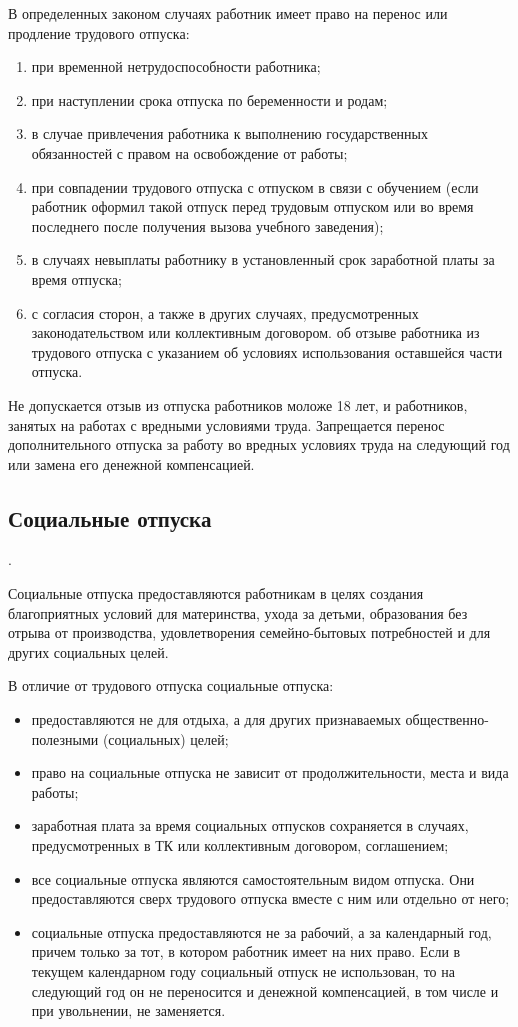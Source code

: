 \documentclass[14pt,a4paper]{extarticle}
\begin{document}
В определенных законом случаях работник имеет право на перенос или продление трудового отпуска:
\begin{enumerate}
\item при временной нетрудоспособности работника;
\item при наступлении срока отпуска по беременности и родам;
\item в случае привлечения работника к выполнению государственных обязанностей с правом на освобождение от работы;
\item при совпадении трудового отпуска с отпуском в связи с обучением (если работник оформил такой отпуск перед трудовым отпуском или во время последнего после получения вызова учебного заведения);
\item в случаях невыплаты работнику в установленный срок заработной платы за время отпуска;
\item с согласия сторон, а также в других случаях, предусмотренных законодательством или коллективным договором. об отзыве работника из трудового отпуска с указанием об условиях использования оставшейся части отпуска.
\end{enumerate}

Не допускается отзыв из отпуска работников моложе 18 лет, и работников, занятых на работах с вредными условиями труда. Запрещается перенос дополнительного отпуска за работу во вредных условиях труда на следующий год или замена его денежной компенсацией.


\subsection{Социальные отпуска}.

Социальные отпуска предоставляются работникам в целях создания благоприятных условий для материнства, ухода за детьми, образования без отрыва от производства, удовлетворения семейно-бытовых потребностей и для других социальных целей.

В отличие от трудового отпуска социальные отпуска:
\begin{itemize}
	\item предоставляются не для отдыха, а для других признаваемых общественно-полезными (социальных) целей;
	\item право на социальные отпуска не зависит от продолжительности, места и вида работы;
	\item заработная плата за время социальных отпусков сохраняется в случаях, предусмотренных в ТК или коллективным договором, соглашением;
	\item все социальные отпуска являются самостоятельным видом отпуска. Они предоставляются сверх трудового отпуска вместе с ним или отдельно от него;
	\item социальные отпуска предоставляются не за рабочий, а за календарный год, причем только за тот, в котором работник имеет на них право. Если в текущем календарном году социальный отпуск не использован, то на следующий год он не переносится и денежной компенсацией, в том числе и при увольнении, не заменяется.
\end{itemize}
\end{document}
